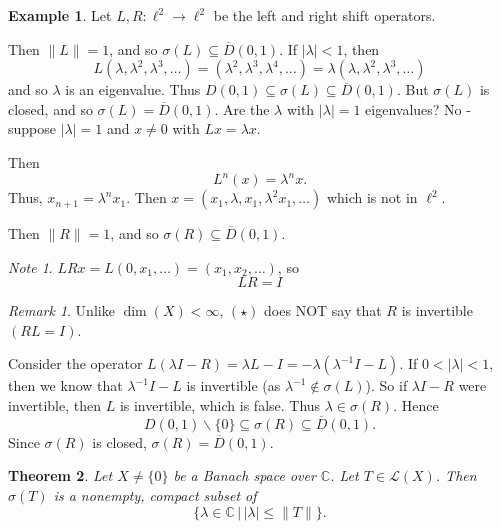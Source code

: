\documentclass[10pt, oneside, reqno]{amsbook}
\theoremstyle{plain}%
\newtheorem{thm}{Theorem}[section]
\theoremstyle{definition}
\newtheorem{exmp}[thm]{Example}
\theoremstyle{remark}
\newtheorem*{rem}{Remark}
\newtheorem*{note}{Note}
\newcommand{\given}{ \, | \,}
\newcommand{\Com}{\mathbb{C}}
\begin{document}
\begin{exmp}
    Let $L, R : \ell^2 \rightarrow \ell^2$ be the left and right shift operators.  
    
    Then $\| L \| = 1$, and so $\sigma(L) \subseteq \overline D(0,1)$.  If $| \lambda | < 1$, then \[
        L(\lambda, \lambda^2, \lambda^3, \dots) = (\lambda^2, \lambda^3, \lambda^4, \dots) = \lambda(\lambda, \lambda^2, \lambda^3,\dots)
    \] 
    and so $\lambda$ is an eigenvalue.  Thus $D(0,1) \subseteq \sigma(L) \subseteq \overline D(0,1)$.  But $\sigma(L)$ is closed, and so $\sigma(L) = \overline D(0,1)$.  Are the $\lambda$ with $| \lambda | = 1$ eigenvalues?  No - suppose $| \lambda | = 1$ and $x \neq 0$ with $Lx = \lambda x$.  
    
    Then \[
        L^n (x) = \lambda^n x.  
    \]  Thus, $x_{n+1} = \lambda^n x_1$.  Then $x = (x_1, \lambda, x_1, \lambda^2 x_1, \dots)$ which is not in $\ell^2$.
    
    Then $\| R \| = 1$, and so $\sigma(R) \subseteq \overline D(0,1)$.
    
    \begin{note}
        $LRx = L(0, x_1, \dots) = (x_1, x_2, \dots)$, so \[
            LR = I \tag{$\star$}
        \]
    \end{note}
    \begin{rem}
        Unlike $\dim(X) < \infty$, $(\star)$ does NOT say that $R$ is invertible $(RL = I)$.
    \end{rem}

    Consider the operator $L(\lambda I - R) = \lambda L - I = -\lambda(\lambda^{-1} I - L)$.  If $0 < | \lambda | < 1$, then we know that $\lambda^{-1}I - L$ is invertible (as $\lambda^{-1} \notin \sigma(L)$).  So if $\lambda I - R$ were invertible, then $L$ is invertible, which is false. Thus $\lambda \in \sigma(R)$. Hence \[
        D(0,1) \backslash \{ 0 \} \subseteq \sigma(R) \subseteq \overline D(0,1).  
    \]  Since $\sigma(R)$ is closed, $\sigma(R) = \overline D(0,1)$. 
\end{exmp} 

\begin{thm}
    Let $X \neq \{ 0 \}$ be a Banach space over $\Com$.  Let $T \in \mathcal L(X)$.  Then $\sigma(T)$ is a nonempty, compact subset of \[
        \{ \lambda \in \Com \given | \lambda | \leq \| T \| \}.
    \]
\end{thm}
\end{document}
